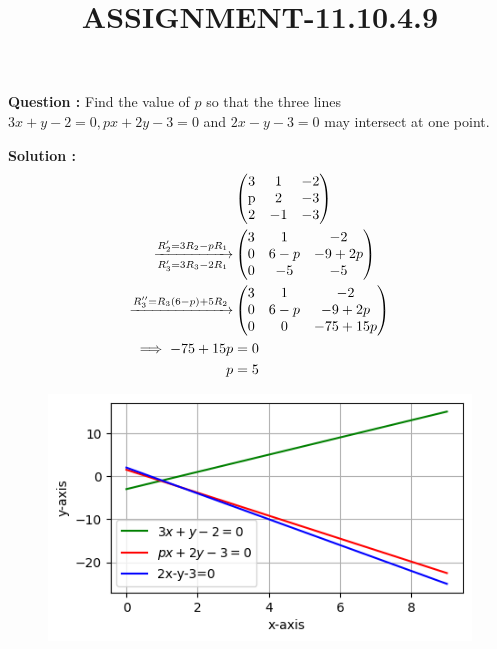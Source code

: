 \documentclass[12pt]{article}
\providecommand{\myvec}[1]{\ensuremath{\begin{pmatrix}#1\end{pmatrix}}}
\begin{document}
\title{\textbf{ASSIGNMENT-11.10.4.9}}
\date{}
\maketitle
\textbf{Question :} Find the value of $p$ so that the three lines $3x+y-2=0,px+2y-3=0$ and $2x-y-3=0$ may intersect at one point.


\textbf{Solution :}
\begin{align}  
&\myvec{
    3 &1&-2 \\
     $p$&2&-3\\
     2&-1&-3
}\\
\xrightarrow[R_3'=3R_3-2R_1]{R_2'=3R_2-pR_1}&\myvec{
    3&1&-2\\
     $0$&6-p&-9+2p\\
     0&-5&-5}\\
 \xrightarrow{R_3''=R_3(6-p)+5R_2}&\myvec{
    3&1&-2\\
     0&6-p&-9+2p\\
     0&0&-75+15p}\\
  \implies -75+15p&=0\\
    p&=5
\end{align}

\begin{figure}
    \centering
    \includegraphics[width=\columnwidth]{fig/11.10.4.9.png}
    \caption{}
    \label{11.10.4.9}
\end{figure}
\end{document}
